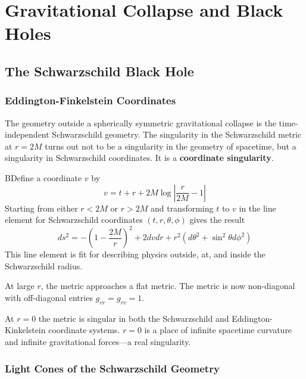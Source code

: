 %
%
%
\chapter{Gravitational Collapse and Black Holes}
\label{GravCol} %




\section{The Schwarzschild Black Hole}
\label{sec:schwarzBlack}

\subsection{Eddington-Finkelstein Coordinates}

The geometry outside a spherically symmetric gravitational collapse is the time-independent Schwarzschild geometry. The singularity in the Schwarzschild metric at $r = 2M$ turns out not to be a singularity in the geometry of spacetime, but a singularity in Schwarzschild coordinates. It is a \textbf{coordinate singularity}.

BDefine a coordinate $v$ by $$v = t+r+2M\log\left|\frac{r}{2M}-1\right|$$
Starting from either $r < 2M$ or $r > 2M$ and transforming $t$ to $v$ in the line element for Schwarzschild coordinates $(t,r,\theta,\phi)$ gives the result $$ds^2 = -\left(1-\frac{2M}{r}\right)^2+2dvdr+r^2(d\theta^2+\sin^2\theta d\phi^2)$$
This line element is fit for describing physics outside, at, and inside the Schwarzschild radius.

At large $r$, the metric approaches a flat metric. The metric is now non-diagonal with off-diagonal entries $g_{vr} = g_{rv} = 1$.

At $r = 0$ the metric is singular in both the Schwarzschild and Eddington-Kinkelstein coordinate systems. $r = 0$ is a place of infinite spacetime curvature and infinite gravitational forces---a real singularity.

\subsection{Light Cones of the Schwarzschild Geometry}

